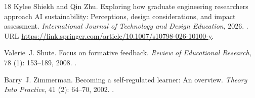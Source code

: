 \documentclass[11pt,a4paper]{article}
\begin{document}
\begin{thebibliography}{18}
Kylee Shiekh and Qin Zhu.
\newblock Exploring how graduate engineering researchers approach {AI}
  sustainability: Perceptions, design considerations, and impact assessment.
\newblock \emph{International Journal of Technology and Design Education},
  2026.
\newblock {}.
\newblock URL
  \url{https://link.springer.com/article/10.1007/s10798-026-10100-y}.

Valerie~J. Shute.
\newblock Focus on formative feedback.
\newblock \emph{Review of Educational Research}, 78 (1):
  153--189, 2008.
\newblock {}.

Barry~J. Zimmerman.
\newblock Becoming a self-regulated learner: An overview.
\newblock \emph{Theory Into Practice}, 41 (2): 64--70, 2002.
\newblock {}.

\end{thebibliography}
\end{document}

